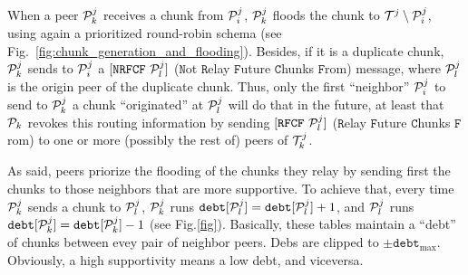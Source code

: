 %
%

When a peer ${\cal P}^j_k$ receives a chunk from ${\cal P}^j_i$,
${\cal P}^j_k$ floods the chunk to ${\cal T}^j \setminus {\cal
P}^j_i$, using again a prioritized round-robin schema (see
Fig.~\ref{fig:chunk_generation_and_flooding}). Besides, if it is a
duplicate chunk, ${\cal P}^j_k$ sends to ${\cal P}^j_i$ a
$[\mathtt{NRFCF}~{\cal P}^j_l]$ ($\mathtt{N}$ot $\mathtt{R}$elay
$\mathtt{F}$uture $\mathtt{C}$hunks $\mathtt{F}$rom) message, where
${\cal P}^j_l$ is the origin peer of the duplicate chunk. Thus, only
the first ``neighbor'' ${\cal P}^j_i$ to send to ${\cal P}^j_k$ a
chunk ``originated'' at ${\cal P}^j_l$ will do that in the future, at
least that ${\cal P}_k$ revokes this routing information by sending
$[\mathtt{RFCF}~{\cal P}^j_l]$ ($\mathtt{R}$elay $\mathtt{F}$uture
$\mathtt{C}$hunks $\mathtt{F}$rom) to one or more (possibly the rest
of) peers of ${\cal T}^j_k$.

As said, peers priorize the flooding of the chunks they relay by
sending first the chunks to those neighbors that are more
supportive. To achieve that, every time ${\cal P}^j_k$ sends a chunk
to ${\cal P}^j_l$, ${\cal P}^j_k$ runs $\mathtt{debt}[{\cal P}^j_l]
= \mathtt{debt}[{\cal P}^j_l]+1$, and ${\cal P}^j_l$ runs
$\mathtt{debt}[{\cal P}^j_k] =
\mathtt{debt}[{\cal P}^j_k]-1$ (see Fig.\ref{fig}). Basically, these
tables maintain a ``debt'' of chunks between evey pair of neighbor
peers. Debs are clipped to $\pm\mathtt{debt}_{\text{max}}$. Obviously,
a high supportivity means a low debt, and viceversa.

\begin{comment}
In each round, peers check if a chunk have been received from the rest
of peers of the team (${\cal P}_k\in {\cal T}_j)$). If not, peers send
a $[\mathtt{propagate}~{\cal P}_i]$ to one or more (possibly
to the rest of) peers of the team, where ${\cal P}_i$ is the origin peer
of the missing chunk. At this point, the process continues as
described in Section~\ref{dbs:chunk_flooding}.
\end{comment}

\begin{comment}
For each ${\cal P}_k\in N({\cal P}_i)$, ${\cal P}_i$ checks if a chunk
has been received from ${\cal P}_k$. If ${\cal P}_i$ detects that
${\cal P}_k$ has not sent a chunk to it during $L$ consecutive rounds,
performs $N({\cal P}_i) = N({\cal P}_i)\setminus{\cal P}_k$, and stops
sending to ${\cal P}_k$ more chunks.
\end{comment}
\begin{comment}
computes a
``chunk-debt'', denoted by $d({\cal P}_k)$, that is incremented each
time a chunk is received from ${\cal P}_k$ and decremented each time a
chunk is sent to ${\cal P}_k$. If ${\cal P}_i$ verifies that $d({\cal
  P}_k)>D$ (the maximum debt), then ${\cal P}_i$ considers that ${\cal
  P}_k$ is unable to communicate with it, performs $N({\cal P}_i) =
N({\cal P}_i)\setminus{\cal P}_k$, and stops sending to ${\cal P}_k$
more chunks.
\end{comment}


